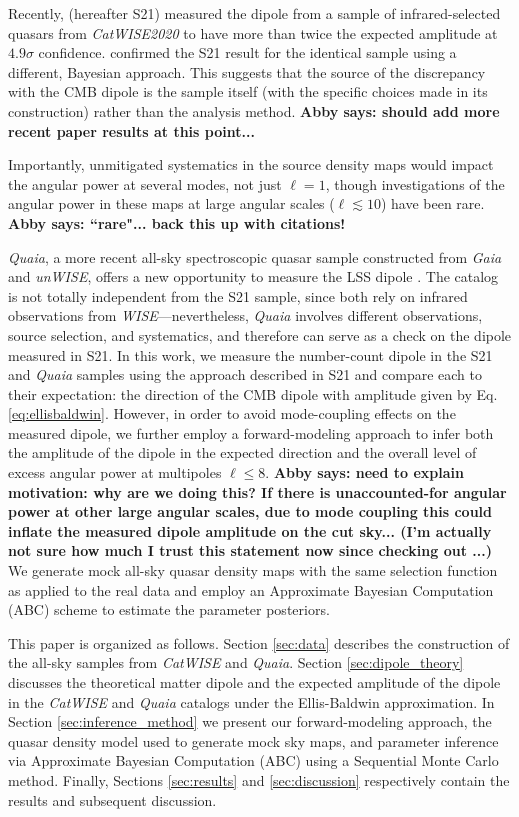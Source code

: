 \documentclass[modern]{aastex631}
\newcommand{\abby}[1]{\textbf{Abby says: #1}}
\newcommand{\catwise}{\textsl{CatWISE}\xspace}
\newcommand{\catwisetwentytwenty}{\textsl{CatWISE2020}\xspace}
\newcommand{\quaia}{\textsl{Quaia}\xspace}
\newcommand{\gaia}{\textsl{Gaia}\xspace}
\newcommand{\unwise}{\textsl{unWISE}\xspace}
\begin{document}
Recently, \citet{secrest_test_2021} (hereafter S21) measured the dipole from a sample of infrared-selected quasars from \catwisetwentytwenty to have more than twice the expected amplitude at $4.9\sigma$ confidence.
\citet{dam_testing_2022} confirmed the S21 result for the identical sample using a different, Bayesian approach.
This suggests that the source of the discrepancy with the CMB dipole is the sample itself (with the specific choices made in its construction) rather than the analysis method.
\abby{should add more recent paper results at this point...}

Importantly, unmitigated systematics in the source density maps would impact the angular power at several modes, not just $\ell=1$, though investigations of the angular power in these maps at large angular scales ($\ell\lesssim 10$) have been rare.
\abby{``rare"... back this up with citations!}

\quaia, a more recent all-sky spectroscopic quasar sample constructed from \gaia and \unwise, offers a new opportunity to measure the LSS dipole \citep{storey-fisher_quaia_2023}.
The catalog is not totally independent from the S21 sample, since both rely on infrared observations from \textit{WISE}—nevertheless, \quaia involves different observations, source selection, and systematics, and therefore can serve as a check on the dipole measured in S21.
In this work, we measure the number-count dipole in the S21 and \quaia samples using the approach described in S21 and compare each to their expectation: the direction of the CMB dipole with amplitude given by Eq. \ref{eq:ellisbaldwin}.
However, in order to avoid mode-coupling effects on the measured dipole, we further employ a forward-modeling approach to infer both the amplitude of the dipole in the expected direction and the overall level of excess angular power at multipoles $\ell\le 8$.
\abby{need to explain motivation: why are we doing this? If there is unaccounted-for angular power at other large angular scales, due to mode coupling this could inflate the measured dipole amplitude on the cut sky... (I'm actually not sure how much I trust this statement now since checking out \citet{oayda_cosmic_2024}...)}
We generate mock all-sky quasar density maps with the same selection function as applied to the real data and employ an Approximate Bayesian Computation (ABC) scheme to estimate the parameter posteriors.

This paper is organized as follows.
Section \ref{sec:data} describes the construction of the all-sky samples from \catwise and \quaia.
Section \ref{sec:dipole_theory} discusses the theoretical matter dipole and the expected amplitude of the dipole in the \catwise and \quaia catalogs under the Ellis-Baldwin approximation.
In Section \ref{sec:inference_method} we present our forward-modeling approach, the quasar density model used to generate mock sky maps, and parameter inference via Approximate Bayesian Computation (ABC) using a Sequential Monte Carlo method.
Finally, Sections \ref{sec:results} and \ref{sec:discussion} respectively contain the results and subsequent discussion.
\end{document}
